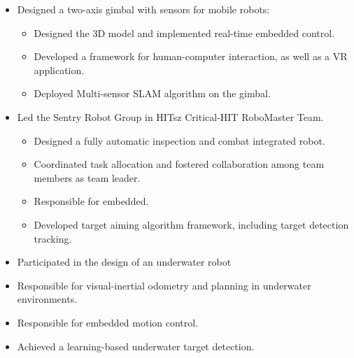\documentclass[11pt,a4paper]{moderncv}        %
\begin{document}
%
{
\begin{itemize}%
\item Designed a two-axis gimbal with sensors for mobile robots:
\begin{itemize}%
\item Designed the 3D model and implemented real-time embedded control.
\item Developed a framework for human-computer interaction, as well as a VR application.
\item Deployed Multi-sensor SLAM algorithm on the gimbal.  
\end{itemize}
\end{itemize}
}

%
{
\begin{itemize}%
\item Led the Sentry Robot Group in HITsz Critical-HIT RoboMaster Team.
\begin{itemize}
\item Designed a fully automatic inspection and combat integrated robot.
\item Coordinated task allocation and fostered collaboration among team members as team leader.
\item Responsible for embedded. 
\item Developed target aiming algorithm framework, including target detection tracking.
\end{itemize}
\end{itemize}
}

%
{
\begin{itemize}%
    \item Participated in the design of an underwater robot  
    \item Responsible for visual-inertial odometry and planning in underwater environments.
    \item Responsible for embedded motion control.
    \item Achieved a learning-based underwater target detection.
\end{itemize}
}
%
{}
\end{document}
